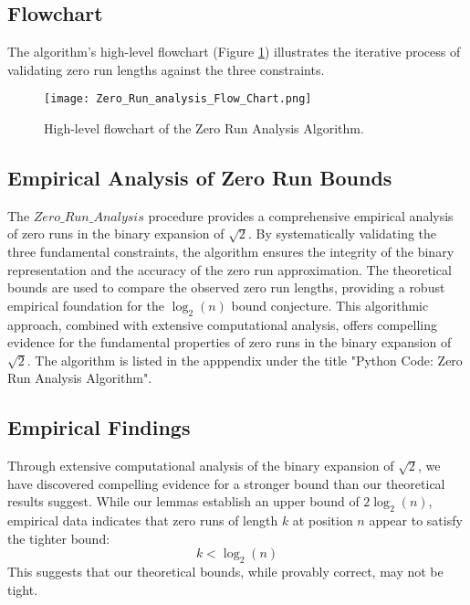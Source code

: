 \subsection{Flowchart}
The algorithm's high-level flowchart (Figure \ref{fig:zero_run_flowchart}) illustrates the iterative process of validating zero run lengths against the three constraints.
\begin{figure}[H]
\centering
\texttt{[image: Zero\_Run\_analysis\_Flow\_Chart.png]}
\caption{High-level flowchart of the Zero Run Analysis Algorithm.}
\label{fig:zero_run_flowchart}
\end{figure}

\subsection{Empirical Analysis of Zero Run Bounds}
The \texttt{$Zero\_Run\_Analysis$} procedure provides a comprehensive empirical analysis of zero runs in the binary expansion of $\sqrt{2}$. By systematically validating the three fundamental constraints, the algorithm ensures the integrity of the binary representation and the accuracy of the zero run approximation. The theoretical bounds are used to compare the observed zero run lengths, providing a robust empirical foundation for the $\log_2(n)$ bound conjecture. This algorithmic approach, combined with extensive computational analysis, offers compelling evidence for the fundamental properties of zero runs in the binary expansion of $\sqrt{2}$.
The algorithm is listed in the apppendix under the title "Python Code: Zero Run Analysis Algorithm".

\subsection{Empirical Findings}
Through extensive computational analysis of the binary expansion of $\sqrt{2}$, we have discovered compelling evidence for a stronger bound than our theoretical results suggest. While our lemmas establish an upper bound of $2\log_2(n)$, empirical data indicates that zero runs of length $k$ at position $n$ appear to satisfy the tighter bound:
\[
k < \log_2(n)
\]
This suggests that our theoretical bounds, while provably correct, may not be tight.

